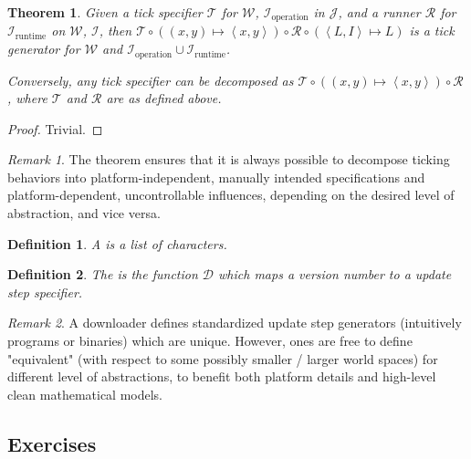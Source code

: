 \documentclass{book}
\newtheorem{definition}{Definition}
\newtheorem{theorem}{Theorem}
\theoremstyle{definition}\newtheorem{mechanism}{Mechanism}
\theoremstyle{remark}\newtheorem*{remark}{Remark}
\begin{document}
\begin{theorem}\label{thm:spec-impl-decompose}
	Given a tick specifier $\mathcal T$ for $\mathcal W$, $\mathcal I_{\text{operation}}$ in $\mathcal J$, and a runner $\mathcal R$ for $\mathcal I_{\text{runtime}}$ on $\mathcal W$, $\mathcal I$, then $\mathcal T \circ \left((x, y) \mapsto \left<x, y\right>\right) \circ \mathcal R \circ \left(\left<L, I\right> \mapsto L\right)$ is a tick generator for $\mathcal W$ and $\mathcal I_{\text{operation}} \cup \mathcal I_{\text{runtime}}$.
	
	Conversely, any tick specifier can be decomposed as $\mathcal T \circ \left((x, y) \mapsto \left<x, y\right>\right) \circ \mathcal R$, where $\mathcal T$ and $\mathcal R$ are as defined above.
\end{theorem}

\begin{proof}
	Trivial.
\end{proof}

\begin{remark}
	The theorem ensures that it is always possible to decompose ticking behaviors into platform-independent, manually intended specifications and platform-dependent, uncontrollable influences, depending on the desired level of abstraction, and vice versa.
\end{remark}

\begin{definition}
	A  is a list of characters.
\end{definition}

\begin{definition}
	The  is the function $\mathscr D$ which maps a version number to a update step specifier.
\end{definition}

\begin{remark}
	A downloader defines standardized update step generators (intuitively programs or binaries) which are unique. However, ones are free to define "equivalent" (with respect to some possibly smaller / larger world spaces) for different level of abstractions, to benefit both platform details and high-level clean mathematical models.
\end{remark}

\subsection*{Exercises}
\end{document}
